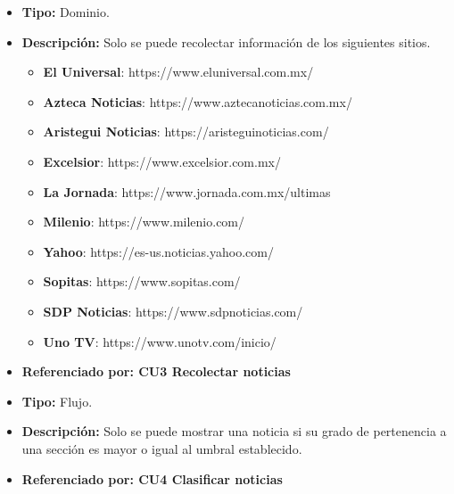 \begin{itemize}
  \item \textbf{Tipo:} Dominio.
  \item \textbf{Descripción:} Solo se puede recolectar información de los siguientes sitios.\\

  \begin{itemize}

    \item \textbf{El Universal}: https://www.eluniversal.com.mx/
    \item \textbf{Azteca Noticias}: https://www.aztecanoticias.com.mx/
    \item \textbf{Aristegui Noticias}: https://aristeguinoticias.com/
    \item \textbf{Excelsior}: https://www.excelsior.com.mx/
    \item \textbf{La Jornada}: https://www.jornada.com.mx/ultimas
    \item \textbf{Milenio}: https://www.milenio.com/
    \item \textbf{Yahoo}: https://es-us.noticias.yahoo.com/
    \item \textbf{Sopitas}: https://www.sopitas.com/
    \item \textbf{SDP Noticias}: https://www.sdpnoticias.com/
    \item \textbf{Uno TV}: https://www.unotv.com/inicio/

  \end{itemize} 
  \item \textbf{Referenciado por: CU3 Recolectar noticias}  \\
\end{itemize}

\begin{itemize}
  \item \textbf{Tipo:}  Flujo.
  \item \textbf{Descripción:} Solo se puede mostrar una noticia si su grado de pertenencia a una sección
  es mayor o igual al umbral establecido.
  \item \textbf{Referenciado por: CU4 Clasificar noticias}  \\
\end{itemize}



